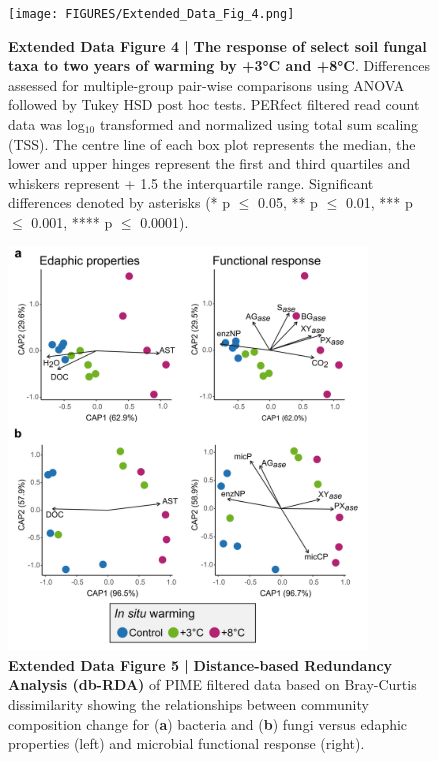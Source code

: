 \documentclass[
  letterpaper,
  DIV=11,
  numbers=noendperiod]{scrartcl}
\begin{document}
\begin{figure}

{\centering \texttt{[image: FIGURES/Extended\_Data\_Fig\_4.png]}

}

\caption{\textbf{Extended Data Figure 4 |}
\textbf{The response of select soil fungal taxa to two years of warming by +3°C and +8°C}.
Differences assessed for multiple-group pair-wise comparisons using
ANOVA followed by Tukey HSD post hoc tests. PERfect filtered read count
data was log\(_{10}\) transformed and normalized using total sum scaling
(TSS). The centre line of each box plot represents the median, the lower
and upper hinges represent the first and third quartiles and whiskers
represent + 1.5 the interquartile range. Significant differences denoted
by asterisks (* p \(\le\) 0.05, ** p \(\le\) 0.01, *** p \(\le\) 0.001,
**** p \(\le\) 0.0001).}

\end{figure}

\begin{figure}

{\centering \includegraphics[width=0.85\textwidth,height=\textheight]{FIGURES/Extended_Data_Fig_5.png}

}

\caption{\textbf{Extended Data Figure 5 |}
\textbf{Distance-based Redundancy Analysis (db-RDA)} of PIME filtered
data based on Bray-Curtis dissimilarity showing the relationships
between community composition change for (\textbf{a}) bacteria and
(\textbf{b}) fungi versus edaphic properties (left) and microbial
functional response (right).}

\end{figure}
\end{document}
